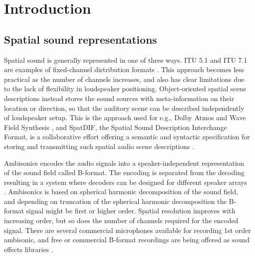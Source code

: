 \documentclass{article}
\title{\papertitle}
\begin{document}
%
\capstartfalse
\maketitle
\capstarttrue




\begin{abstract}
The abstract should be placed at the top left column and should contain about 150–-200 words.
\end{abstract}




\section{Introduction}\label{sec:introduction}

\subsection{Spatial sound representations}\label{sec:spatial-sound}

Spatial sound is generally represented in one of three ways.
ITU 5.1 and ITU 7.1 are examples of fixed-channel distribution formats \cite{ITU:1993_surround_5:1}.
This approach becomes less practical as the number of channels increases, and also has clear limitations due to the lack of flexibility in loudspeaker positioning.
Object-oriented spatial scene descriptions instead stores the sound sources with meta-information on their location or direction, so that the auditory scene can be described independently of loudspeaker setup.
This is the approach used for e.g., Dolby Atmos and Wave Field Synthesis \cite{dolby:2014atmos},
and SpatDIF, the Spatial Sound Description Interchange Format, is a collaborative effort offering a semantic and syntactic specification for storing and transmitting such spatial audio scene descriptions \cite{Peters:2013spatdif}.

Ambisonics encodes the audio signals into a speaker-in\-dependent representation of the sound field called B-format.
The encoding is separated from the decoding resulting in a system where decoders can be designed for different speak\-er arrays \cite{Wiggins:2004PhDThesis}.
Ambisonics is based on spherical harmonic decomposition of the sound field, and depending on truncation of the spherical harmonic decomposition the B-for\-mat signal might be first or higher order.
Spatial resolution improves with increasing order, but so does the number of channels required for the encoded signal.
There are several commercial microphones available for recording 1st order ambisonic, and free or commercial B-format recordings are being offered as sound effects libraries \cite{deleflie2014:ambisonia,darcourt:2014surlib}.
\end{document}
